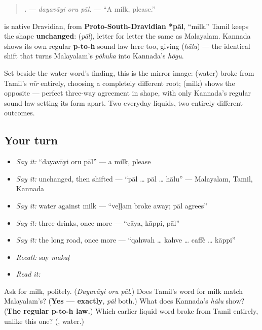 \begin{quote}
\textbf{  .} — \emph{dayavāyi oru pāl.} — \textquotedblleft{}A milk, please.\textquotedblright{}
\end{quote}

\begin{cousinweb}
\textbf{} is native Dravidian, from \textbf{Proto-South-Dravidian *pāl}, \textquotedblleft{}milk.\textquotedblright{} Tamil keeps the shape \textbf{unchanged}: \textbf{} (\emph{pāl}), letter for letter the same as Malayalam. Kannada shows its own regular \textbf{p‑to‑h} sound law here too, giving \textbf{} (\emph{hālu}) — the identical shift that turns Malayalam's \emph{pōkuka} into Kannada's \emph{hōgu}.

Set beside the water-word's finding, this is the mirror image: \textbf{} (water) broke from Tamil's \emph{nīr} entirely, choosing a completely different root; \textbf{} (milk) shows the opposite — perfect three-way agreement in shape, with only Kannada's regular sound law setting its form apart. Two everyday liquids, two entirely different outcomes.
\end{cousinweb}

\subsection*{Your turn}
\begin{itemize}
\raggedright
  \item \emph{Say it:} \textquotedblleft{}dayavāyi oru pāl\textquotedblright{} — a milk, please
  \item \emph{Say it:} unchanged, then shifted — \textquotedblleft{}pāl … pāl … hālu\textquotedblright{} — Malayalam, Tamil, Kannada
  \item \emph{Say it:} water against milk — \textquotedblleft{}veḷḷam broke away; pāl agrees\textquotedblright{}
  \item \emph{Say it:} three drinks, once more — \textquotedblleft{}cāya, kāppi, pāl\textquotedblright{}
  \item \emph{Say it:} the long road, once more — \textquotedblleft{}qahwah … kahve … caffè … kāppi\textquotedblright{}
  \item \emph{Recall:} say \emph{makaḷ}
  \item \emph{Read it:} \textbf{}
\end{itemize}

\begin{tcolorbox}[breakable,colback=teal!4,colframe=teal!35!black,title={Before you move on}]
Ask for milk, politely. (\emph{Dayavāyi oru pāl}.) Does Tamil's word for milk match Malayalam's? (\textbf{Yes — exactly}, \emph{pāl} both.) What does Kannada's \emph{hālu} show? (\textbf{The regular p-to-h law.}) Which earlier liquid word broke from Tamil entirely, unlike this one? (\textbf{}, water.)
\end{tcolorbox}
